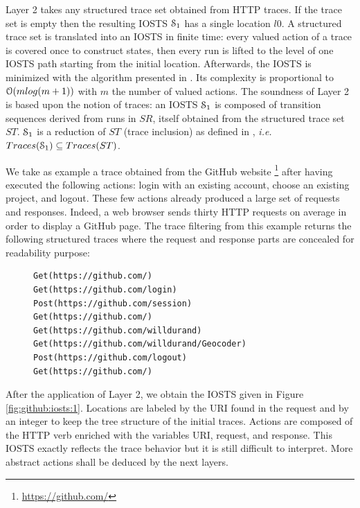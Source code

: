 Layer 2 takes any structured trace set obtained from HTTP traces.
If the trace set is empty then the resulting IOSTS
$\EuScript{S}_1$ has a single location $l0$. A structured trace
set is translated into an IOSTS in finite time: every valued
action of a trace is covered once to construct states, then every
run is lifted to the level of one IOSTS path starting from the
initial location. Afterwards, the IOSTS is minimized with the
algorithm presented in \cite{Fernandez89animplementation}. Its
complexity is proportional to $\EuScript{O}(mlog (m+1))$ with $m$
the number of valued actions. The soundness of Layer 2 is based
upon the notion of traces: an IOSTS $\EuScript{S}_1$ is composed
of transition sequences derived from runs in $SR$, itself
obtained from the structured trace set $ST$. $\EuScript{S}_1$ is
a reduction of $ST$ (trace inclusion) as defined in
\cite{petrenko06}, \emph{i.e.} $Traces(\EuScript{S}_1) \subseteq Traces(ST)$.

\begin{example}
We take as example a trace obtained from the GitHub website
\footnote{\url{https://github.com/}} after having executed the
following actions: login with an existing account, choose an
existing project, and logout. These few actions already produced
a large set of requests and responses. Indeed, a web browser
sends thirty HTTP requests on average in order to display a
GitHub page. The trace filtering from this example returns the
following structured traces where the request and response parts
are concealed for readability purpose:

\begin{figure}[ht]
\begin{BVerbatim}
Get(https://github.com/)
Get(https://github.com/login)
Post(https://github.com/session)
Get(https://github.com/)
Get(https://github.com/willdurand)
Get(https://github.com/willdurand/Geocoder)
Post(https://github.com/logout)
Get(https://github.com/)
\end{BVerbatim}
\end{figure}

After the application of Layer 2, we obtain the IOSTS given in
Figure \ref{fig:github:iosts:1}. Locations are labeled by the URI
found in the request and by an integer to keep the tree structure
of the initial traces. Actions are composed of the HTTP verb
enriched with the variables URI, request, and response. This
IOSTS exactly reflects the trace behavior but it is still
difficult to interpret. More abstract actions shall be deduced by
the next layers.
\end{example}

